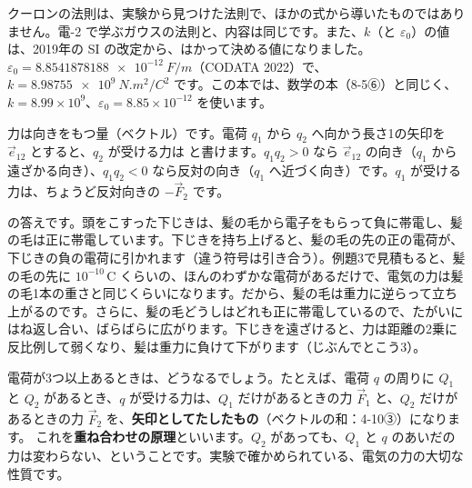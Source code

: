\begin{seikaku}
クーロンの法則は、実験から見つけた法則で、ほかの式から導いたものではありません。電-2 で学ぶガウスの法則と、内容は同じです。また、$k$（と $\varepsilon_0$）の値は、2019年の SI の改定から、はかって決める値になりました。$\varepsilon_0=\qty{8.8541878188e-12}{F/m}$（CODATA 2022）で、$k=\qty{8.98755e9}{N.m^2/C^2}$ です。この本では、数学の本（8-5⑥）と同じく、$k=8.99\times10^9$、$\varepsilon_0=8.85\times10^{-12}$ を使います。
\end{seikaku}

力は向きをもつ量（ベクトル）です。電荷 $q_1$ から $q_2$ へ向かう長さ1の矢印を $\vec e_{12}$ とすると、$q_2$ が受ける力は
と書けます。$q_1q_2>0$ なら $\vec e_{12}$ の向き（$q_1$ から遠ざかる向き）、$q_1q_2<0$ なら反対の向き（$q_1$ へ近づく向き）です。$q_1$ が受ける力は、ちょうど反対向きの $-\vec F_2$ です。

\begin{phmodel}[点電荷]
\end{phmodel}

\label{ph:電-1:hatena}\bkhatenaref の答えです。頭をこすった下じきは、髪の毛から電子をもらって負に帯電し、髪の毛は正に帯電しています。下じきを持ち上げると、髪の毛の先の正の電荷が、下じきの負の電荷に引かれます（違う符号は引き合う）。例題3で見積もると、髪の毛の先に $10^{-10}$\,C くらいの、ほんのわずかな電荷があるだけで、電気の力は髪の毛1本の重さと同じくらいになります。だから、髪の毛は重力に逆らって立ち上がるのです。さらに、髪の毛どうしはどれも正に帯電しているので、たがいにはね返し合い、ばらばらに広がります。下じきを遠ざけると、力は距離の2乗に反比例して弱くなり、髪は重力に負けて下がります（じぶんでとこう3）。

\label{ph:電-1:sec3}
電荷が3つ以上あるときは、どうなるでしょう。たとえば、電荷 $q$ の周りに $Q_1$ と $Q_2$ があるとき、$q$ が受ける力は、$Q_1$ だけがあるときの力 $\vec F_1$ と、$Q_2$ だけがあるときの力 $\vec F_2$ を、\textbf{矢印としてたしたもの}（ベクトルの和：4-10③）になります。
これを\textbf{重ね合わせの原理}といいます。$Q_2$ があっても、$Q_1$ と $q$ のあいだの力は変わらない、ということです。実験で確かめられている、電気の力の大切な性質です。

